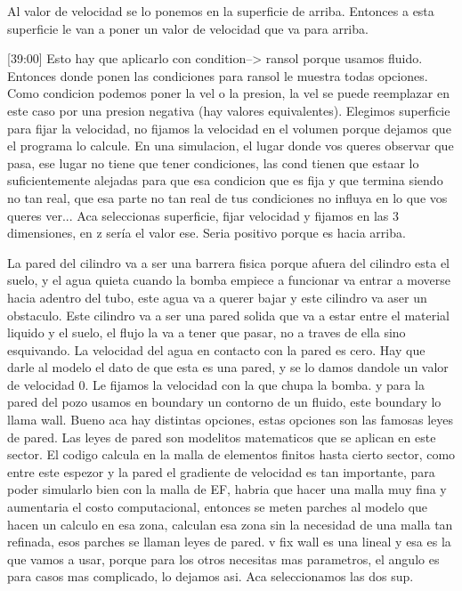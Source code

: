\documentclass[10pt,a4paper,final]{article}
\begin{document}
Al valor de velocidad se lo ponemos en la superficie de arriba. Entonces a esta superficie le van a poner un valor de velocidad que va para arriba.

[39:00]
Esto hay que aplicarlo con condition--> ransol porque usamos fluido. Entonces donde ponen las condiciones para ransol le muestra todas opciones. Como condicion podemos poner la vel o la presion, la vel se puede reemplazar en este caso por una presion negativa (hay valores equivalentes). Elegimos superficie para fijar la velocidad, no fijamos la velocidad en el volumen porque dejamos que el programa lo calcule. En una simulacion, el lugar donde vos queres observar que pasa, ese lugar no tiene que tener condiciones, las cond tienen que estaar lo suficientemente alejadas para que esa condicion que es fija y que termina siendo no tan real, que esa parte no tan real de tus condiciones no influya en lo que vos queres ver... Aca seleccionas superficie, fijar velocidad y fijamos en las 3 dimensiones, en z sería el valor ese. Seria positivo porque es hacia arriba.

La pared del cilindro va a ser una barrera fisica porque afuera del cilindro esta el suelo, y el agua quieta cuando la bomba empiece a funcionar va entrar a moverse hacia adentro del tubo, este agua va a querer bajar y este cilindro va aser un obstaculo. Este cilindro va a ser una pared solida que va a estar entre el material liquido y el suelo, el flujo la va a tener que pasar, no a traves de ella sino esquivando. La velocidad del agua en contacto con la pared es cero. Hay que darle al modelo el dato de que esta es una pared, y se lo damos dandole un valor de velocidad 0. Le fijamos la velocidad con la que chupa la bomba. y para la pared del pozo usamos en boundary un contorno de un fluido, este boundary lo llama wall. Bueno aca hay distintas opciones, estas opciones son las famosas leyes de pared. Las leyes de pared son modelitos matematicos que se aplican en este sector. El codigo calcula en la malla de elementos finitos hasta cierto sector, como entre este espezor y la pared el gradiente de velocidad es tan importante, para poder simularlo bien con la malla de EF, habria que hacer una malla muy fina y aumentaria el costo computacional, entonces se meten parches al modelo que hacen un calculo en esa zona, calculan esa zona sin la necesidad de una malla tan refinada, esos parches se llaman leyes de pared. v fix wall es una lineal y esa es la que vamos a usar, porque para los otros necesitas mas parametros, el angulo es para casos mas complicado, lo dejamos asi. Aca seleccionamos las dos sup. 
\end{document}
